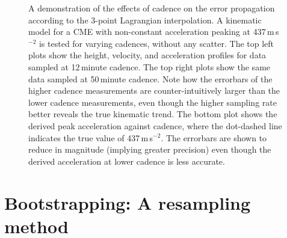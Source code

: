 \documentclass[structabstract]{aa}
\begin{document}
\begin{figure}[!ht]
\caption{A demonstration of the effects of cadence on the error propagation according to the 3-point Lagrangian interpolation. A kinematic model for a CME with non-constant acceleration peaking at 437\,m\,s$^{-2}$ is tested for varying cadences, without any scatter. The top left plots show the height, velocity, and acceleration profiles for data sampled at 12\,minute cadence. The top right plots show the same data sampled at 50\,minute cadence. Note how the errorbars of the higher cadence measurements are counter-intuitively larger than the lower cadence measurements, even though the higher sampling rate better reveals the true kinematic trend. The bottom plot shows the derived peak acceleration against cadence, where the dot-dashed line indicates the true value of 437\,m\,s$^{-2}$. The errorbars are shown to reduce in magnitude (implying greater precision) even though the derived acceleration at lower cadence is less accurate.}
\label{fig_cadence_hva}
\end{figure}


\section{Bootstrapping: A resampling method}
\label{sect:bootstrapping}
\end{document}
